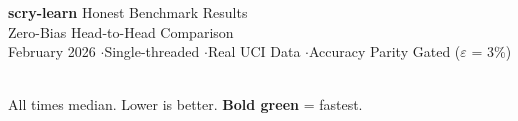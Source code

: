 \documentclass[11pt,a4paper]{article}
\begin{document}
\begin{center}
{\LARGE\color{googleblue}\textbf{scry-learn} \color{darktext}Honest Benchmark Results}\\[6pt]
{\large\color{neutralgray}Zero-Bias Head-to-Head Comparison}\\[4pt]
{\small\color{neutralgray}February 2026 \quad$\cdot$\quad Single-threaded \quad$\cdot$\quad Real UCI Data \quad$\cdot$\quad Accuracy Parity Gated ($\varepsilon$ = 3\%)}
\end{center}

\vspace{8pt}

\\[2pt]
{\small All times median. Lower is better. \textbf{\color{wingreen}Bold green} = fastest.}
\end{document}
